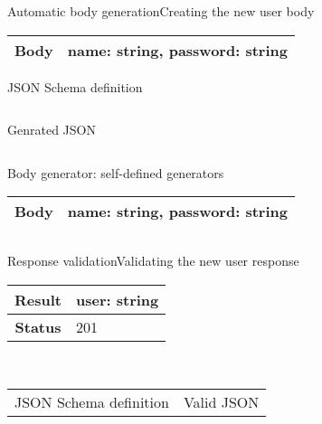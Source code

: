 \begin{frame}{Automatic body generation}{Creating the new user body}
  \centering
  \begin{tabular}{| c | l |}
    \hline
    \textbf{Body} & name: string, password: string \\ \hline
  \end{tabular}

  \begin{minipage}{0.5\textwidth}
    \centering
    {JSON Schema definition}
    \inputminted{js}{./code/example1_body.jsch}
  \end{minipage}
  \vline
  \pause
  \hspace{10pt}
  \begin{minipage}{0.4\textwidth}
    \centering
    {Genrated JSON}             %
    \inputminted{js}{./code/example1_body-gen.jsch}
  \end{minipage}

  \centering

\end{frame}

\begin{frame}{Body generator: self-defined generators}
  \centering
  \begin{tabular}{| c | l |}
    \hline
    \textbf{Body} & name: string, password: string \\ \hline
  \end{tabular}
  \centering
  \inputminted{js}{./code/example1_body_custom_generators.jsch}
\end{frame}

\begin{frame}{Response validation}{Validating the new user response}
  \centering
  \begin{tabular}{| c | l |}
    \hline
    \textbf{Result}    & user: string \\ \hline
    \textbf{Status}    & 201 \\ \hline
  \end{tabular}
  \\
  \begin{tabular}{p{6cm} l}
    JSON Schema definition & Valid JSON
  \end{tabular}
  \centering
  \begin{minipage}{0.5\textwidth}
    \inputminted{js}{./code/example1_new_user_response.jsch}
  \end{minipage}
  \vline
  \pause
  \hspace{10pt}
  \begin{minipage}{0.4\textwidth}
    \centering
    \inputminted{js}{./code/example1_new_user_val.jsch}
  \end{minipage}

  \centering
\end{frame}

